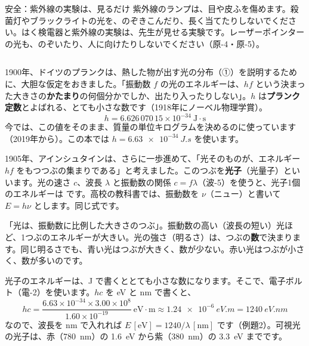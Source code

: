 \begin{column}{安全：紫外線の実験は、見るだけ}
紫外線のランプは、目や皮ふを傷めます。殺菌灯やブラックライトの光を、のぞきこんだり、長く当てたりしないでください。はく検電器と紫外線の実験は、先生が見せる実験です。レーザーポインターの光も、のぞいたり、人に向けたりしないでください（原-4・原-5）。
\end{column}


\label{ph:原-2:sec3}
1900年、ドイツのプランクは、熱した物が出す光の分布（①）を説明するために、大胆な仮定をおきました。「振動数 $f$ の光のエネルギーは、$hf$ という決まった大きさの\textbf{かたまり}の何個分かでしか、出たり入ったりしない」。$h$ は\textbf{プランク定数}とよばれる、とても小さな数です（1918年にノーベル物理学賞）。
\[ h=6.626\,070\,15\times10^{-34}\ \mathrm{J\cdot s} \]
今では、この値をそのまま、質量の単位キログラムを決めるのに使っています（2019年から）。この本では $h=\qty{6.63e-34}{J.s}$ を使います。

1905年、アインシュタインは、さらに一歩進めて、「光そのものが、エネルギー $hf$ をもつつぶの集まりである」と考えました。このつぶを\textbf{光子}（光量子）といいます。光の速さ $c$、波長 $\lambda$ と振動数の関係 $c=f\lambda$（波-5）を使うと、光子1個のエネルギーは
\label{ph:原-2:photon}です。高校の教科書では、振動数を $\nu$（ニュー）と書いて $E=h\nu$ とします。同じ式です。

\begin{phyomi}[$E=hf$]
「光は、振動数に比例した大きさのつぶ」。振動数の高い（波長の短い）光ほど、1つぶのエネルギーが大きい。光の強さ（明るさ）は、つぶの\textbf{数}で決まります。同じ明るさでも、青い光はつぶが大きく、数が少ない。赤い光はつぶが小さく、数が多いのです。
\end{phyomi}

光子のエネルギーは、J で書くととても小さな数になります。そこで、電子ボルト（電-2）を使います。$hc$ を eV と nm で書くと、
\[ hc=\frac{6.63\times10^{-34}\times3.00\times10^8}{1.60\times10^{-19}}\ \mathrm{eV\cdot m}\approx\qty{1.24e-6}{eV.m}=\qty{1240}{eV.nm} \]
なので、波長を nm で入れれば $E\,[\mathrm{eV}]=1240/\lambda\,[\mathrm{nm}]$ です（例題2）。可視光の光子は、赤（\qty{780}{nm}）の \qty{1.6}{eV} から紫（\qty{380}{nm}）の \qty{3.3}{eV} までです。

